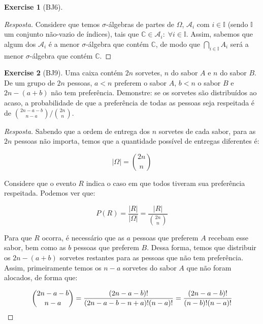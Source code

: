 \documentclass[
]{article}
\theoremstyle{definition}
\theoremstyle{definition}
\theoremstyle{definition}
\newtheorem{exercise}{Exercise}[section]
\theoremstyle{definition}
\theoremstyle{remark}
\begin{document}
\begin{exercise}[BJ6]
\begin{proof}[Resposta]
Considere que temos \(\sigma\)-álgebras de partes de \(\Omega\), \(\mathcal{A}_{i}\) com \(i \in \mathbb{I}\) (sendo \(\mathbb{I}\) um conjunto não-vazio de índices), tais que \(\mathbb{C} \in \mathcal{A}_{i}: \; \forall i \in \mathbb{I}\). Assim, sabemos que algum dos \(\mathcal{A}_{i}\) é a menor \(\sigma\)-álgebra que contém \(\mathbb{C}\), de modo que \(\bigcap_{i \in \mathbb{I}}A_{i}\) será a menor \(\sigma\)-álgebra que contém \(\mathbb{C}\).
\end{proof}

\end{exercise}

\begin{exercise}[BJ9]

Uma caixa contém \(2n\) sorvetes, \(n\) do sabor \(A\) e \(n\) do sabor \(B\). De um grupo de \(2n\) pessoas, \(a < n\) preferem o sabor \(A\), \(b < n\) o sabor \(B\) e \(2n-(a+b)\) não tem preferência. Demonstre: se os sorvetes são distribuídos ao acaso, a probabilidade de que a preferência de todas as pessoas seja respeitada é de \(\binom{2n-a-b}{n-a}/\binom{2n}{n}\).

\begin{proof}[Resposta]
Sabendo que a ordem de entrega dos \(n\) sorvetes de cada sabor, para as \(2n\) pessoas não importa, temos que a quantidade possível de entregas diferentes é:

\begin{equation*}
|\Omega| = \binom{2n}{n}
\end{equation*}

Considere que o evento \(R\) indica o caso em que todos tiveram sua preferência respeitada. Podemos ver que:

\begin{equation*}
P(R) = \frac{|R|}{|\Omega|} = \frac{|R|}{\binom{2n}{n}}
\end{equation*}

Para que \(R\) ocorra, é necessário que as \(a\) pessoas que preferem \(A\) recebam esse sabor, bem como as \(b\) pessoas que preferem \(B\). Dessa forma, temos que distribuir os \(2n-(a+b)\) sorvetes restantes para as pessoas que não tem preferência. Assim, primeiramente temos os \(n-a\) sorvetes do sabor \(A\) que não foram alocados, de forma que:

\begin{equation}
\binom{2n-a-b}{n-a} = \frac{(2n-a-b)!}{(2n-a-b-n+a)!(n-a)!} = \frac{(2n-a-b)!}{(n-b)!(n-a)!}\\
\label{eq:aloca}
\end{equation}


\end{proof}
\end{exercise}
\end{document}

